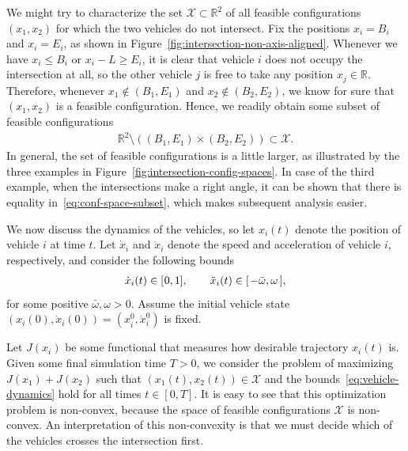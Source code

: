 \documentclass[a4paper]{report}
\theoremstyle{definition}
\theoremstyle{plain}
\begin{document}
We might try to characterize the set $\mathcal{X} \subset \mathbb{R}^{2}$ of all
feasible configurations $(x_{1}, x_{2})$ for which the two vehicles do not
intersect.
%
%
Fix the positions $x_{i} = B_{i}$ and $x_{i} = E_{i}$, as shown in
Figure~\ref{fig:intersection-non-axis-aligned}.
%
Whenever we have $x_{i} \leq B_{i}$ or $x_{i} - L \geq E_{i}$, it is clear that
vehicle $i$ does not occupy the intersection at all, so the other vehicle $j$ is
free to take any position $x_{j} \in \mathbb{R}$. Therefore, whenever
$x_{1} \notin (B_{1},E_{1})$ and $x_{2} \notin (B_{2}, E_{2})$, we know for sure
that $(x_{1}, x_{2})$ is a feasible configuration. Hence, we readily obtain some
subset of feasible configurations
\begin{align}\label{eq:conf-space-subset}
  \mathbb{R}^{2} \setminus ((B_{1},E_{1}) \times (B_{2},E_{2})) \subset \mathcal{X} .
\end{align}
In general, the set of feasible configurations is a little larger, as
illustrated by the three examples in
Figure~\ref{fig:intersection-config-spaces}.
%
In case of the third example, when the intersections make a right angle, it can
be shown that there is equality in~\eqref{eq:conf-space-subset}, which makes
subsequent analysis easier.

We now discuss the dynamics of the vehicles, so let $x_{i}(t)$ denote the
position of vehicle $i$ at time $t$.
%
Let $\dot{x}_{i}$ and $\ddot{x}_{i}$ denote the speed and acceleration of
vehicle $i$, respectively, and consider the following bounds
\begin{align}\label{eq:vehicle-dynamics}
  \dot{x}_{i}(t) \in [\hspace{0.05em} 0, 1] , \quad\quad  \ddot{x}_{i}(t) \in [\hspace{0.1em} -\bar{\omega}, \omega \, ] ,
\end{align}
for some positive $\bar{\omega}, \omega > 0$.
%
Assume the initial vehicle state
$(x_{i}(0), \dot{x}_{i}(0)) = (x_{i}^{0}, \dot{x}_{i}^{0})$ is fixed.

Let $J(x_{i})$ be some functional that measures how desirable trajectory
$x_{i}(t)$ is.
%
Given some final
simulation time $T > 0$, we consider the problem of maximizing
$J(x_{1}) + J(x_{2})$ such that $(x_{1}(t), x_{2}(t)) \in \mathcal{X}$ and the
bounds~\eqref{eq:vehicle-dynamics} hold for all times $t \in [0, T]$.
%
It is easy to see that this optimization problem is non-convex, because the
space of feasible configurations $\mathcal{X}$ is non-convex.
%
An interpretation of this non-convexity is that we must decide which of the
vehicles crosses the intersection first.
\end{document}

